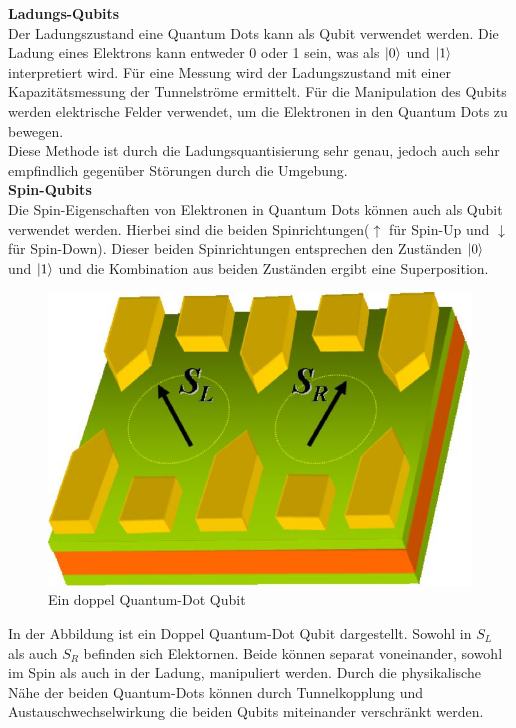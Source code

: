 \textbf{Ladungs-Qubits}\\
Der Ladungszustand eine Quantum Dots kann als Qubit verwendet werden. Die Ladung eines Elektrons kann entweder 0 oder 1 sein, was als $\ket{0}$ und $\ket{1}$ interpretiert wird.
Für eine Messung wird der Ladungszustand mit einer Kapazitätsmessung der Tunnelströme ermittelt.
Für die Manipulation des Qubits werden elektrische Felder verwendet, um die Elektronen in den Quantum Dots zu bewegen.\\

Diese Methode ist durch die Ladungsquantisierung sehr genau, jedoch auch sehr empfindlich gegenüber Störungen durch die Umgebung.\\

\textbf{Spin-Qubits}\\
Die Spin-Eigenschaften von Elektronen in Quantum Dots können auch als Qubit verwendet werden. Hierbei sind die beiden Spinrichtungen($\uparrow$ für Spin-Up und $\downarrow$ für Spin-Down).
Dieser beiden Spinrichtungen entsprechen den Zuständen $\ket{0}$ und $\ket{1}$ und die Kombination aus beiden Zuständen ergibt eine Superposition.\\

\begin{figure}[H]
    \centering
    \includegraphics[width=0.75\linewidth]{img/QD.png}
    \caption{Ein doppel Quantum-Dot Qubit \cite{Golovach_condensed_2006}}
    \label{fig:double-Quantum-Dot}
\end{figure}

In der Abbildung ist ein Doppel Quantum-Dot Qubit dargestellt. Sowohl in $S_L$ als auch $S_R$ befinden sich Elektornen. Beide können separat voneinander, sowohl im Spin als auch in der Ladung, manipuliert werden.
Durch die physikalische Nähe der beiden Quantum-Dots können durch Tunnelkopplung und Austauschwechselwirkung die beiden Qubits miteinander verschränkt werden.\\

